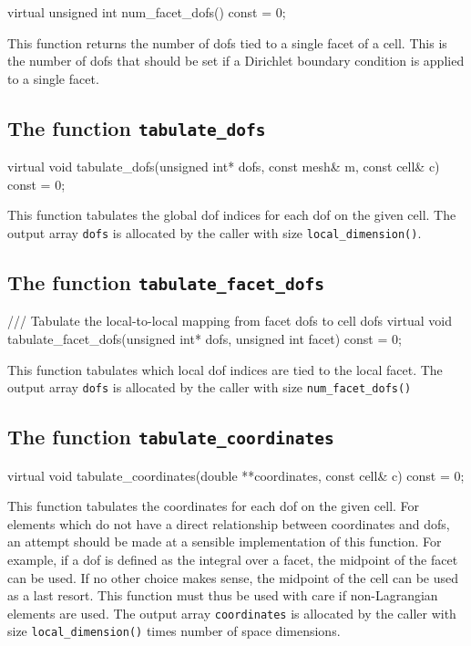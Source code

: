 \begin{code}
virtual unsigned int num_facet_dofs() const = 0;
\end{code}

This function returns the number of dofs tied to a single facet of a cell.
This is the number of dofs that should be set if a Dirichlet boundary condition is applied to a single facet.

\subsection{The function \texttt{tabulate\_dofs}}

\begin{code}
virtual void tabulate_dofs(unsigned int* dofs,
                           const mesh& m,
                           const cell& c) const = 0;
\end{code}

This function tabulates the global dof indices for each dof on the given cell.
The output array \texttt{dofs} is allocated by the caller with size \texttt{local\_dimension()}.

\subsection{The function \texttt{tabulate\_facet\_dofs}}

\begin{code}
/// Tabulate the local-to-local mapping from facet dofs to cell dofs
virtual void tabulate_facet_dofs(unsigned int* dofs,
                                 unsigned int facet) const = 0;
\end{code}

This function tabulates which local dof indices are tied to the local facet.
The output array \texttt{dofs} is allocated by the caller with size \texttt{num\_facet\_dofs()}

\subsection{The function \texttt{tabulate\_coordinates}}

\begin{code}
virtual void tabulate_coordinates(double **coordinates,
                                  const cell& c) const = 0;
\end{code}

This function tabulates the coordinates for each dof on the given cell.
For elements which do not have a direct relationship between coordinates and dofs,
an attempt should be made at a sensible implementation of this function.
For example, if a dof is defined as the integral over a facet, the midpoint
of the facet can be used. If no other choice makes sense, the midpoint of the cell
can be used as a last resort. This function must thus be used with care if
non-Lagrangian elements are used.
The output array \texttt{coordinates} is allocated by the caller with size \texttt{local\_dimension()} times number of space dimensions.

